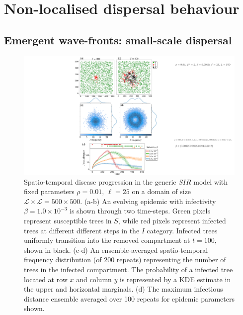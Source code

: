 \newpage
\section{Non-localised dispersal behaviour}

\blindtext


\subsection{Emergent wave-fronts: small-scale dispersal}
\blindtext

\begin{figure}
    \centering
    \includegraphics[scale=0.50]{chapter5/figures/fig1-sir-spatio-temporal.pdf}
    \caption{Spatio-temporal disease progression in the generic $SIR$ model with fixed parameters $\rho=0.01,\ \ell = 25$ on a domain of size $\mathcal{L} \times \mathcal{L} = 500 \times 500$. (a-b) An evolving epidemic with infectivity $\beta=1.0\times 10^{-3}$ is shown through two time-steps. Green pixels represent susceptible trees in $S$, while red pixels represent infected trees at different different steps in the $I$ category. Infected trees uniformly transition into the removed compartment at $t=100$, shown in black. (c-d) An ensemble-averaged spatio-temporal frequency distribution (of 200 repeats) representing the number of trees in the infected compartment. The probability of a infected tree located at row $x$ and column $y$ is represented by a KDE estimate in the upper and horizontal marginals. (d) The maximum infectious distance ensemble averaged over 100 repeats for epidemic parameters shown.}
\label{fig:sgm-evol}
\end{figure}


